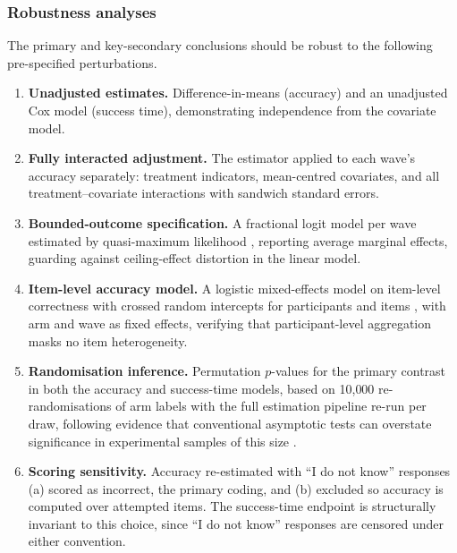 \subsubsection{Robustness analyses}
\label{app:robustness}
The primary and key-secondary conclusions should be robust to the following pre-specified perturbations.
\begin{enumerate}
    \item \textbf{Unadjusted estimates.} Difference-in-means (accuracy) and an unadjusted Cox model (success time), demonstrating independence from the covariate model.
    \item \textbf{Fully interacted adjustment.} The \textcite{lin2013} estimator applied to each wave's accuracy separately: treatment indicators, mean-centred covariates, and all treatment--covariate interactions with sandwich standard errors. %
    \item \textbf{Bounded-outcome specification.} A fractional logit model per wave estimated by quasi-maximum likelihood \parencite{papke1996}, %
    reporting average marginal effects, guarding against ceiling-effect distortion in the linear model.
    \item \textbf{Item-level accuracy model.} A logistic mixed-effects model on item-level correctness with crossed random intercepts for participants and items \parencite{baayen2008}, %
    with arm and wave as fixed effects, verifying that participant-level aggregation masks no item heterogeneity.
    \item \textbf{Randomisation inference.} Permutation $p$-values for the primary contrast in both the accuracy and success-time models, based on 10{,}000 re-randomisations of arm labels with the full estimation pipeline re-run per draw, following evidence that conventional asymptotic tests can overstate significance in experimental samples of this size \parencite{young2019}. %
    \item \textbf{Scoring sensitivity.} Accuracy re-estimated with ``I do not know'' responses (a) scored as incorrect, the primary coding, and (b) excluded so accuracy is computed over attempted items. The success-time endpoint is structurally invariant to this choice, since ``I do not know'' responses are censored under either convention.

\end{enumerate}
